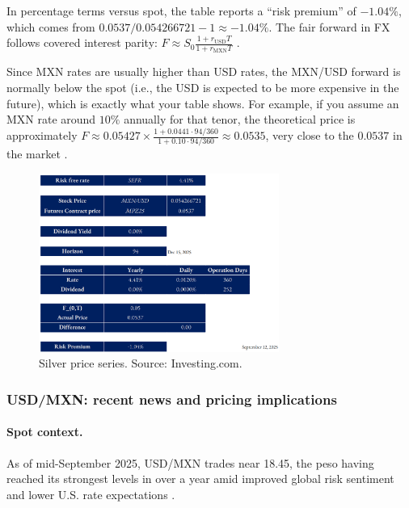 \documentclass[10pt,a4paper]{article} %
\begin{document}
In percentage terms versus spot, the table reports a “risk premium” of \(-1.04\%\), which comes from \(0.0537/0.054266721 - 1 \approx -1.04\%\).
The fair forward in FX follows covered interest parity: \(F \approx S_0 \frac{1 + r_{\text{USD}} T}{1 + r_{\text{MXN}} T}\) \citep{bis_cip_2016,bis_cip_2024}.

Since MXN rates are usually higher than USD rates, the MXN/USD forward is normally below the spot (i.e., the USD is expected to be more expensive in the future), which is exactly what your table shows. For example, if you assume an MXN rate around \(10\%\) annually for that tenor, the theoretical price is approximately \(F \approx 0.05427 \times \frac{1 + 0.0441 \cdot 94/360}{1 + 0.10 \cdot 94/360} \approx 0.0535\), very close to the \(0.0537\) in the market \citep{bis_cip_2016}.

\begin{figure}[h]
\centering
\includegraphics[width=0.7\textwidth]{figures/usdmxn.png}
\caption{Silver price series. Source: Investing.com.}
\end{figure}


\subsubsection{USD/MXN: recent news and pricing implications}

\paragraph{Spot context.}
As of mid-September 2025, USD/MXN trades near 18.45, the peso having reached its strongest levels in over a year amid improved global risk sentiment and lower U.S. rate expectations \citep{reuters_usdmxn_quote,reuters_mx_markets_11sep,reuters_mx_markets_12sep}.
\end{document}
